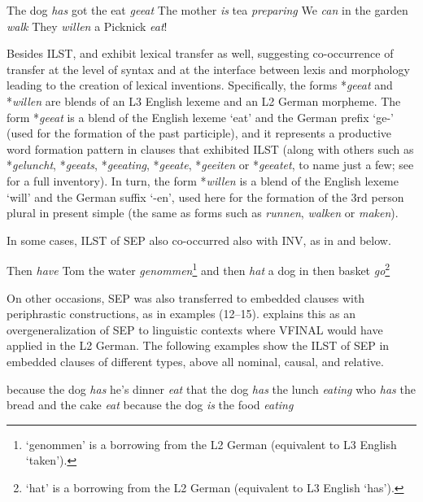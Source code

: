 \documentclass[output=paper,modfonts,nonflat, newtxmath]{langsci/langscibook}
\begin{document}
\ea%
  \label{ex:sanchez7:6}
   The dog  \textit{has} got the eat {\textit{geeat}}
\ex %
  \label{ex:sanchez7:7}
   The mother  \textit{is} tea {\textit{preparing}}
\ex%
  \label{ex:sanchez7:8}
   We  \textit{can} in the garden {\textit{walk}}
\ex%
  \label{ex:sanchez7:9}
     They  \textit{willen} a Picknick {\textit{eat}}!
\z



Besides ILST,  and  exhibit lexical transfer as well, suggesting co-occurrence of transfer at the level of syntax and at the interface between lexis and morphology leading to the creation of lexical inventions. Specifically, the forms *\textit{geeat}  and *\textit{willen}  are blends of an L3 English lexeme and an L2 German morpheme. The form *\textit{geeat} is a blend of the English lexeme ‘eat’ and the German prefix ‘ge-’ (used for the formation of the past participle), and it represents a productive word formation pattern in clauses that exhibited ILST (along with others such as *\textit{geluncht}, *\textit{geeats}, *\textit{geeating}, *\textit{geeate}, *\textit{geeiten} or *\textit{geeatet}, to name just a few; see \citealt{Sánchez2015L2} for a full inventory). In turn, the form *\textit{willen} is a blend of the English lexeme ‘will’ and the German suffix ‘-en’, used here for the formation of the 3rd person plural in present simple (the same as forms such as \textit{runnen}, \textit{walken} or \textit{maken}).

In some cases, ILST of SEP also co-occurred also with INV, as in  and  below.

\ea%
  \label{ex:sanchez7:10}
  Then  \textit{have} Tom the water { \textit{genommen}}\footnote{‘genommen’ is a borrowing from the L2 German (equivalent to L3 English ‘taken’).}
\ex %
  \label{ex:sanchez7:11}
 	and then  \textit{hat} a dog in then basket {\textit{go}}\footnote{‘hat’ is a borrowing from the L2 German (equivalent to L3 English ‘has’).}
\z

On other occasions, SEP was also transferred to embedded clauses with periphrastic constructions, as in examples (12--15). \citet{Sánchez2016} explains this as an overgeneralization of SEP to linguistic contexts where VFINAL would have applied in the L2 German. The following examples show the ILST of SEP in embedded clauses of different types, above all nominal, causal, and relative.

\ea%
  \label{ex:sanchez7:12}
  	because the dog  \textit{has} he’s dinner {\textit{eat}}
\ex %
  \label{ex:sanchez7:13}
  that the dog \textit{has} the lunch {\textit{eating}}
\ex%
  \label{ex:sanchez7:14}
  	who  \textit{has} the bread and the cake { \textit{eat}}
\ex%
  \label{ex:sanchez7:15}
  because the dog  \textit{is} the food { \textit{eating}}
\z
\end{document}

